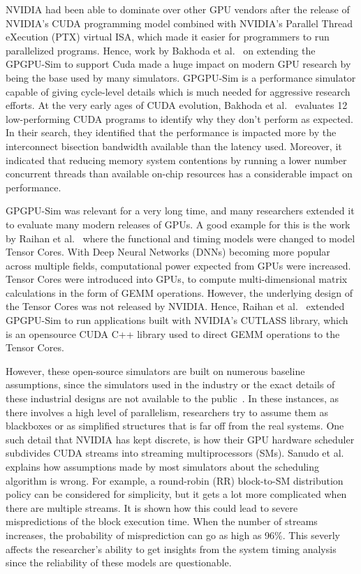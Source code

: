 \documentclass[conference]{IEEEtran}
\begin{document}
NVIDIA had been able to dominate over other GPU vendors after the release of NVIDIA's CUDA programming model combined with NVIDIA's Parallel Thread eXecution (PTX) virtual ISA, which made it easier for programmers to run parallelized programs.
Hence, work by Bakhoda et al.~\cite{Bakhoda2009} on extending the GPGPU-Sim to support Cuda made a huge impact on modern GPU research by being the base used by many simulators.
GPGPU-Sim is a performance simulator capable of giving cycle-level details which is much needed for aggressive research efforts.
At the very early ages of CUDA evolution, Bakhoda et al.~\cite{Bakhoda2009} evaluates 12 low-performing CUDA programs to identify why they don't perform as expected.
In their search, they identified that the performance is impacted more by the interconnect bisection bandwidth available than the latency used.
Moreover, it indicated that reducing memory system contentions by running a lower number concurrent threads than available on-chip resources has a considerable impact on performance.~\cite{Bakhoda2009}

GPGPU-Sim was relevant for a very long time, and many researchers extended it to evaluate many modern releases of GPUs.
A good example for this is the work by Raihan et al.~\cite{Raihan2018} where the functional and timing models were changed to model Tensor Cores.
With Deep Neural Networks (DNNs) becoming more popular across multiple fields, computational power expected from GPUs were increased.
Tensor Cores were introduced into GPUs, to compute multi-dimensional matrix calculations in the form of GEMM operations.
However, the underlying design of the Tensor Cores was not released by NVIDIA.
Hence, Raihan et al.~\cite{Raihan2018} extended GPGPU-Sim to run applications built with NVIDIA’s CUTLASS library, which is an opensource CUDA C++ library used to direct GEMM operations to the Tensor Cores.

However, these open-source simulators are built on numerous baseline assumptions, since the simulators used in the industry or the exact details of these industrial designs are not available to the public~\cite{Khairy2020}.
In these instances, as there involves a high level of parallelism, researchers try to assume them as blackboxes or as simplified structures that is far off from the real systems.
One such detail that NVIDIA has kept discrete, is how their GPU hardware scheduler subdivides CUDA streams into streaming multiprocessors (SMs).
Sanudo et al.~\cite{Sanudo2020} explains how assumptions made by most simulators about the scheduling algorithm is wrong.
For example, a round-robin (RR) block-to-SM distribution policy can be considered for simplicity, but it gets a lot more complicated when there are multiple streams.
It is shown how this could lead to severe mispredictions of the block execution time.
When the number of streams increases, the probability of misprediction can go as high as 96\%.
This severly affects the researcher's ability to get insights from the system timing analysis since the reliability of these models are questionable.
\end{document}
